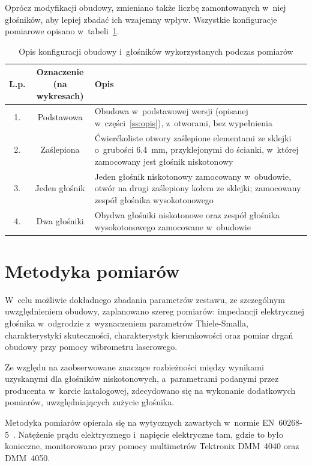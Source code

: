 \documentclass[12pt]{oska}
\begin{document}
	Oprócz modyfikacji obudowy, zmieniano także liczbę zamontowanych w~niej głośników, aby lepiej zbadać ich wzajemny wpływ. Wszystkie konfiguracje pomiarowe opisano w~tabeli~\ref{t:obudowa}.
	
	\begin{table}[!ht]
		\centering
		\caption{Opis konfiguracji obudowy i~głośników wykorzystanych podczas pomiarów}
		\label{t:obudowa}
		\begin{tabular}{|c|c|m{}|}
			\hline
			\textbf{L.p.} & \makecell{\textbf{Oznaczenie}\\\textbf{(na wykresach)}} & \centering\textbf{Opis} \tabularnewline\hline
			1. & Podstawowa & Obudowa w~podstawowej wersji (opisanej w~części~\ref{ss:opis}), z~otworami, bez wypełnienia \\\hline
			2. & Zaślepiona & Ćwierćkoliste otwory zaślepione elementami ze sklejki o~grubości \SI{6,4}{\milli\metre}, przyklejonymi do ścianki, w~której zamocowany jest głośnik niskotonowy\\\hline
			\hline
			3. & Jeden głośnik & Jeden głośnik niskotonowy zamocowany w~obudowie, otwór na drugi zaślepiony kołem ze sklejki; zamocowany zespół głośnika wysokotonowego \\\hline
			4. & Dwa głośniki & Obydwa głośniki niskotonowe oraz zespół głośnika wysokotonowego zamocowane w~obudowie\\\hline
		\end{tabular}
	\end{table}
	
	\section{Metodyka pomiarów}
	
	W~celu możliwie dokładnego zbadania parametrów zestawu, ze szczególnym uwzględnieniem obudowy, zaplanowano szereg pomiarów: impedancji elektrycznej głośnika w~odgrodzie z~wyznaczeniem parametrów Thiele-Smalla, charakterystyki skuteczności, charakterystyk kierunkowości oraz pomiar drgań obudowy przy pomocy wibrometru laserowego.
	
	Ze względu na zaobserwowane znaczące rozbieżności między wynikami uzyskanymi dla głośników niskotonowych, a~parametrami podanymi przez producenta w~karcie katalogowej, zdecydowano się na wykonanie dodatkowych pomiarów, uwzględniających zużycie głośnika.
	
	Metodyka pomiarów opierała się na wytycznych zawartych w~normie EN~60268-5~\cite{norma}. Natężenie prądu elektrycznego i~napięcie elektryczne tam, gdzie to było konieczne, monitorowano przy pomocy multimetrów Tektronix DMM~4040 oraz DMM~4050.
	
\end{document}
